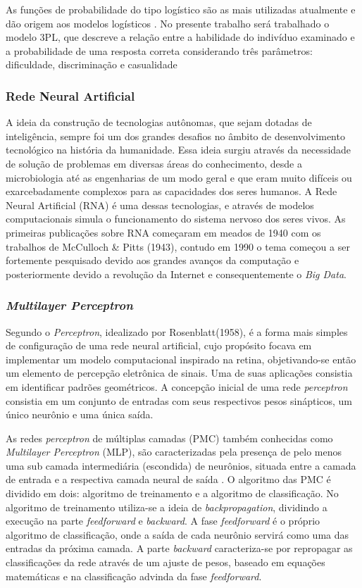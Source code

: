 \documentclass[article,	12pt,	oneside, a4paper,	english, brazil, sumario=tradicional, section=TITLE]{abntex2}
\begin{document}
As funções de probabilidade do tipo logístico são as mais utilizadas atualmente e dão origem aos modelos logísticos . No presente trabalho será trabalhado o modelo 3PL, que descreve a relação entre a habilidade do indivíduo examinado e a probabilidade de uma resposta correta considerando três parâmetros: dificuldade, discriminação e casualidade 

\subsubsection{Rede Neural Artificial}
A ideia da construção de tecnologias autônomas, que sejam dotadas de inteligência, sempre foi um dos grandes desafios no âmbito de desenvolvimento tecnológico na história da humanidade. Essa ideia surgiu através da necessidade de solução de problemas em diversas áreas do conhecimento, desde a microbiologia até as engenharias de um modo geral e que eram muito difíceis ou exarcebadamente complexos para as capacidades dos seres humanos. A Rede Neural Artificial (RNA) é uma dessas tecnologias, e através de modelos computacionais simula o funcionamento do sistema nervoso dos seres vivos. As primeiras publicações sobre RNA começaram em meados de 1940 com os trabalhos de McCulloch \& Pitts (1943), contudo em 1990 o tema começou a ser fortemente pesquisado devido aos grandes avanços da computação e posteriormente devido a revolução da Internet e consequentemente o \textit{Big Data}.

\subsubsection{\textit{Multilayer Perceptron}}
Segundo  o \textit{Perceptron}, idealizado por Rosenblatt(1958), é a forma mais simples de configuração de uma rede neural artificial, cujo propósito focava em implementar um modelo computacional inspirado na retina, objetivando-se então um elemento de percepção eletrônica de sinais. Uma de suas aplicações consistia em identificar padrões geométricos. A concepção inicial de uma rede \textit{perceptron} consistia em um conjunto de entradas com seus respectivos pesos sinápticos, um único neurônio e uma única saída.

As redes \textit{perceptron} de múltiplas camadas (PMC) também conhecidas como \textit{Multilayer Perceptron} (MLP), são caracterizadas pela presença de pelo menos uma sub camada intermediária (escondida) de neurônios, situada entre a camada de entrada e a respectiva camada neural de saída .
O algoritmo das PMC é dividido em dois: algoritmo de treinamento e a algoritmo de classificação. No algoritmo de treinamento utiliza-se a ideia de \textit{backpropagation}, dividindo a execução na parte \textit{feedforward} e \textit{backward}. A fase \textit{feedforward} é o próprio algoritmo de classificação, onde a saída de cada neurônio servirá como uma das entradas da próxima camada. A parte \textit{backward} caracteriza-se por repropagar as classificações da rede através de um ajuste de pesos, baseado em equações matemáticas e na classificação advinda da fase \textit{feedforward}. 
\end{document}
